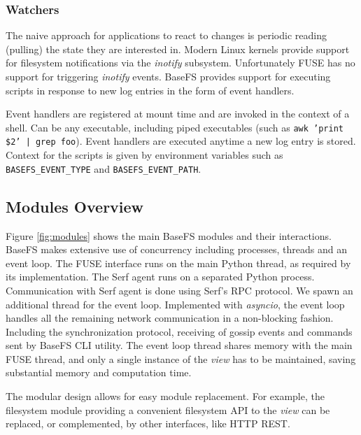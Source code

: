 \documentclass{sig-alternate}
\begin{document}
\subsubsection{Watchers}\label{watchers}
The naive approach for applications to react to changes is periodic reading (pulling) the state they are interested in. Modern Linux kernels provide support for filesystem notifications via the \textit{inotify} subsystem. Unfortunately FUSE has no support for triggering \textit{inotify} events. BaseFS provides support for executing scripts in response to new log entries in the form of event handlers.

Event handlers are registered at mount time and are invoked in the context of a shell. Can be any executable, including piped executables (such as \texttt{awk '{print \$2}' | grep foo}). Event handlers are executed anytime a new log entry is stored. Context for the scripts is given by environment variables such as \texttt{BASEFS\_EVENT\_TYPE} and \texttt{BASEFS\_EVENT\_PATH}.

\subsection{Modules Overview}\label{modules}

Figure \ref{fig:modules} shows the main BaseFS modules and their interactions. BaseFS makes extensive use of concurrency including processes, threads and an event loop. The FUSE interface runs on the main Python thread, as required by its implementation. The Serf agent runs on a separated Python process. Communication with Serf agent is done using Serf's RPC protocol. We spawn an additional thread for the event loop. Implemented with \textit{asyncio}, the event loop handles all the remaining network communication in a non-blocking fashion. Including the synchronization protocol, receiving of gossip events and commands sent by BaseFS CLI utility. The event loop thread shares memory with the main FUSE thread, and only a single instance of the \textit{view} has to be maintained, saving substantial memory and computation time.

The modular design allows for easy module replacement. For example, the filesystem module providing a convenient filesystem API to the \textit{view} can be replaced, or complemented, by other interfaces, like HTTP REST.
\end{document}
